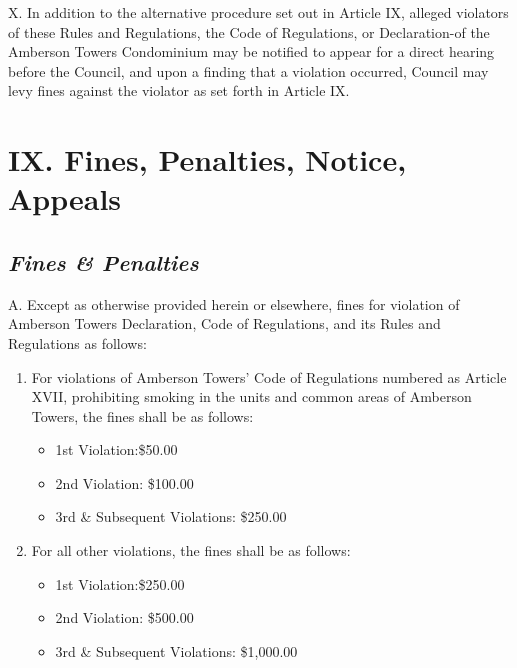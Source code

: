 \documentclass[
]{book}
\providecommand{\tightlist}{%
  \setlength{\itemsep}{0pt}\setlength{\parskip}{0pt}}
\begin{document}
X. In addition to the alternative procedure set out in Article IX, alleged violators of these Rules and Regulations, the Code of Regulations, or Declaration-of the Amberson Towers Condominium may be notified to appear for a direct hearing before the Council, and upon a finding that a violation occurred, Council may levy fines against the violator as set forth in Article IX.

\hypertarget{ix.-fines-penalties-notice-appeals}{%
\section*{IX. Fines, Penalties, Notice, Appeals}\label{ix.-fines-penalties-notice-appeals}}

\hypertarget{fines-penalties}{%
\subsection*{\texorpdfstring{\emph{Fines \& Penalties}}{Fines \& Penalties}}\label{fines-penalties}}

A. Except as otherwise provided herein or elsewhere, fines for violation of Amberson Towers Declaration, Code of Regulations, and its Rules and Regulations as follows:

\begin{enumerate}
\def\labelenumi{\arabic{enumi}.}
\tightlist
\item
  For violations of Amberson Towers' Code of Regulations numbered as Article XVII, prohibiting smoking in the units and common areas of Amberson Towers, the fines shall be as follows:

  \begin{itemize}
  \tightlist
  \item
    1st Violation:\$50.00
  \item
    2nd Violation: \$100.00
  \item
    3rd \& Subsequent Violations: \$250.00
  \end{itemize}
\item
  For all other violations, the fines shall be as follows:

  \begin{itemize}
  \tightlist
  \item
    1st Violation:\$250.00
  \item
    2nd Violation: \$500.00
  \item
    3rd \& Subsequent Violations: \$1,000.00
  \end{itemize}
\end{enumerate}
\end{document}
